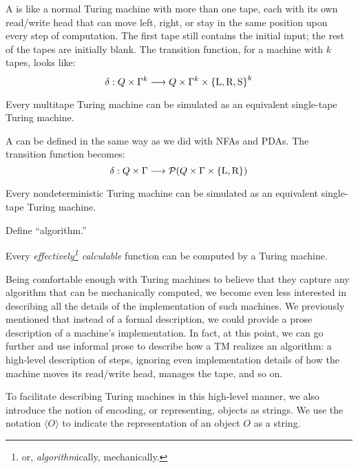 \documentclass[twoside,letterpaper,openany]{book}
\begin{document}
\begin{defn}
A  is like a normal Turing machine with more than one tape, each with its own read/write head that can move left, right, or stay in the same position upon every step of computation. The first tape still contains the initial input; the rest of the tapes are initially blank. The transition function, for a machine with $k$ tapes, looks like:
\[ \delta : Q \times \Gamma^k \longrightarrow Q \times \Gamma^k \times \left\lbrace \textrm{L}, \textrm{R}, \textrm{S} \right\rbrace^k \]
\end{defn}

\begin{stmt}
Every multitape Turing machine can be simulated as an equivalent single-tape Turing machine.
\end{stmt}

\begin{defn}
A  can be defined in the same way as we did with NFAs and PDAs. The transition function becomes:
\[ \delta : Q \times \Gamma \longrightarrow \mathcal{P}(Q \times \Gamma \times \left\lbrace \textrm{L}, \textrm{R} \right\rbrace) \]
\end{defn}

\begin{stmt}
Every nondeterministic Turing machine can be simulated as an equivalent single-tape Turing machine.
\end{stmt}

\begin{exer}
Define ``algorithm.''
\end{exer}

\begin{conjecture}
Every \emph{effectively\footnote{or, \emph{algorithm}ically, mechanically.} calculable} function can be computed by a Turing machine.
\end{conjecture}
 
 \clearpage
 
\newcommand\repof[1]{{\langle{#1}\rangle}}

\begin{discussion}
Being comfortable enough with Turing machines to believe that they capture any algorithm that can be mechanically computed, we become even less interested in describing all the details of the implementation of such machines. We previously mentioned that instead of a formal description, we could provide a prose description of a machine's implementation. In fact, at this point, we can go further and use informal prose to describe how a TM realizes an algorithm: a high-level description of steps, ignoring even implementation details of how the machine moves its read/write head, manages the tape, and so on.

To facilitate describing Turing machines in this high-level manner, we also introduce the notion of encoding, or representing, objects as strings. We use the notation $\repof O$ to indicate the representation of an object $O$ as a string.
\end{discussion}
\end{document}
